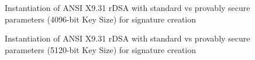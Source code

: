 \documentclass[]{final_report}
\theoremstyle{definition}
\begin{document}
\begin{figure}[H]
    \centering %
     \caption{Instantiation of ANSI X9.31 rDSA with standard vs provably secure parameters (4096-bit Key Size) for signature creation}
    \begin{minipage}{\textwidth}
        \centering
    \end{minipage}
             \label{ansi_sign_4096bit_table}
\end{figure}

\begin{figure}[H]
    \centering %
     \caption{Instantiation of ANSI X9.31 rDSA with standard vs provably secure parameters (5120-bit Key Size) for signature creation}
    \begin{minipage}{\textwidth}
        \centering
    \end{minipage}
     \label{ansi_sign_5120bit_table}
\end{figure}
\end{document}
